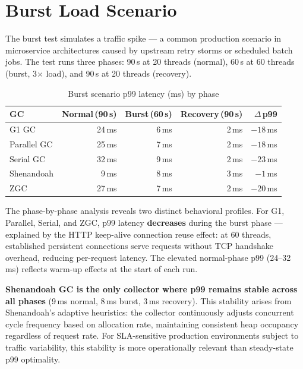 \section{Burst Load Scenario}
\label{sec:results-burst}

The burst test simulates a traffic spike --- a common production scenario in microservice architectures caused by upstream retry storms or scheduled batch jobs. The test runs three phases: 90\,s at 20 threads (normal), 60\,s at 60 threads (burst, 3$\times$ load), and 90\,s at 20 threads (recovery).

\begin{table}[htbp]
\centering
\caption{Burst scenario p99 latency (ms) by phase}
\label{tab:burst-phases}
\begin{tabular}{lrrrr}
\hline
\textbf{GC} & \textbf{Normal\,(90\,s)} & \textbf{Burst\,(60\,s)} & \textbf{Recovery\,(90\,s)} & \textbf{$\Delta$\,p99} \\
\hline
G1 GC       & 24\,ms &  6\,ms & 2\,ms & $-18$\,ms \\
Parallel GC & 25\,ms &  7\,ms & 2\,ms & $-18$\,ms \\
Serial GC   & 32\,ms &  9\,ms & 2\,ms & $-23$\,ms \\
Shenandoah  &  9\,ms &  8\,ms & 3\,ms & $-1$\,ms  \\
ZGC         & 27\,ms &  7\,ms & 2\,ms & $-20$\,ms \\
\hline
\end{tabular}
\end{table}

The phase-by-phase analysis reveals two distinct behavioral profiles. For G1, Parallel, Serial, and ZGC, p99 latency \textbf{decreases} during the burst phase --- explained by the HTTP keep-alive connection reuse effect: at 60 threads, established persistent connections serve requests without TCP handshake overhead, reducing per-request latency. The elevated normal-phase p99 (24--32\,ms) reflects warm-up effects at the start of each run.

\textbf{Shenandoah GC is the only collector where p99 remains stable across all phases} (9\,ms normal, 8\,ms burst, 3\,ms recovery). This stability arises from Shenandoah's adaptive heuristics: the collector continuously adjusts concurrent cycle frequency based on allocation rate, maintaining consistent heap occupancy regardless of request rate. For SLA-sensitive production environments subject to traffic variability, this stability is more operationally relevant than steady-state p99 optimality.

